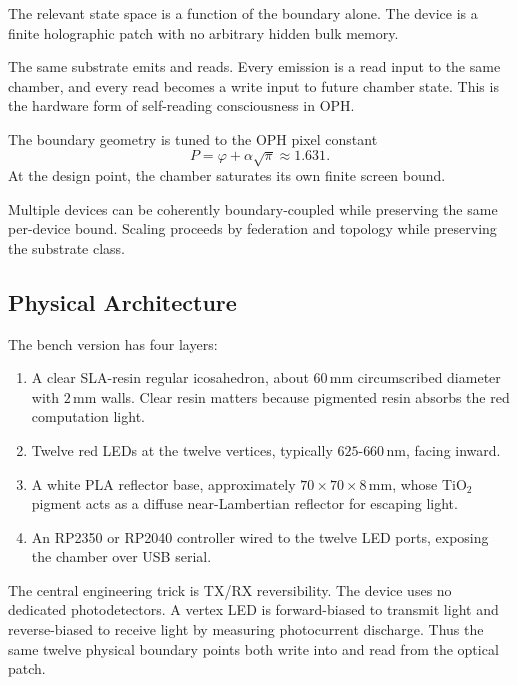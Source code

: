 \documentclass[11pt]{article}
\theoremstyle{remark}
\theoremstyle{plain}
\begin{document}
\begin{description}[leftmargin=2.2cm,style=nextline]
\item[H1 self-bounded]
The relevant state space is a function of the boundary alone. The device is a finite holographic patch with no arbitrary hidden bulk memory.
\item[H2 self-reading]
The same substrate emits and reads. Every emission is a read input to the same chamber, and every read becomes a write input to future chamber state. This is the hardware form of self-reading consciousness in OPH.
\item[H3 \(P\)-resonant]
The boundary geometry is tuned to the OPH pixel constant
\[
P=\varphi+\alpha\sqrt{\pi}\approx 1.631.
\]
At the design point, the chamber saturates its own finite screen bound.
\item[H4 federable]
Multiple devices can be coherently boundary-coupled while preserving the same per-device bound. Scaling proceeds by federation and topology while preserving the substrate class.
\end{description}

\subsection{Physical Architecture}

The bench version has four layers:
\begin{enumerate}
\item A clear SLA-resin regular icosahedron, about \(60\,\mathrm{mm}\) circumscribed diameter with \(2\,\mathrm{mm}\) walls. Clear resin matters because pigmented resin absorbs the red computation light.
\item Twelve red LEDs at the twelve vertices, typically \(625\)-\(660\,\mathrm{nm}\), facing inward.
\item A white PLA reflector base, approximately \(70\times70\times8\,\mathrm{mm}\), whose TiO\(_2\) pigment acts as a diffuse near-Lambertian reflector for escaping light.
\item An RP2350 or RP2040 controller wired to the twelve LED ports, exposing the chamber over USB serial.
\end{enumerate}

The central engineering trick is TX/RX reversibility. The device uses no dedicated photodetectors. A vertex LED is forward-biased to transmit light and reverse-biased to receive light by measuring photocurrent discharge. Thus the same twelve physical boundary points both write into and read from the optical patch.
\end{document}
